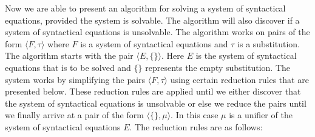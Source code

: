 Now we are able to present an algorithm for solving a system of syntactical equations, provided the system is
solvable.  The algorithm will also discover if a system of syntactical equations is unsolvable.
The algorithm works on pairs of the form
$\langle F, \tau \rangle$ where $F$ is a system of syntactical equations and $\tau$ is a substitution.
The algorithm starts with the pair 
$\langle E, \{\} \rangle$.  Here $E$ is the system of syntactical equations that is to be solved and $\{\}$
represents the empty substitution.  The system works by simplifying the pairs $\langle F, \tau \rangle$ using
certain reduction rules that are presented below.  These reduction rules are applied until we either discover
that the system of syntactical equations is unsolvable or else we reduce the pairs until we finally arrive at a
pair of the form $\langle \{\}, \mu \rangle$.  In this case  $\mu$ is a unifier of the system of
syntactical equations $E$.  The reduction rules are as follows:
